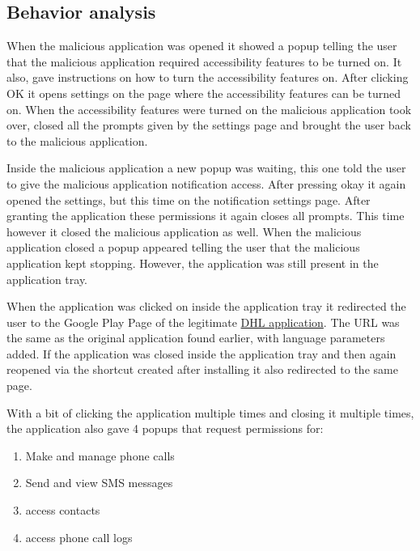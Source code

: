 \subsection{Behavior analysis}

When the malicious application was opened it showed a popup telling the user that the malicious application required accessibility features to be turned on.
It also, gave instructions on how to turn the accessibility features on.
After clicking OK it opens settings on the page where the accessibility features can be turned on. 
When the accessibility features were turned on the malicious application took over, closed all the prompts given by the settings page and brought the user back to the malicious application.

Inside the malicious application a new popup was waiting, this one told the user to give the malicious application notification access. After pressing okay it again opened the settings, but this time on the notification settings page. After granting the application these permissions it again closes all prompts. 
This time however it closed the malicious application as well.
When the malicious application closed a popup appeared telling the user that the malicious application kept stopping.
However, the application was still present in the application tray.

When the application was clicked on inside the application tray it redirected the user to the Google Play Page of the legitimate \href{https://play.google.com/store/apps/details?id=com.dhl.exp.dhlmobile&hl=en&gl=US}{DHL application}.
The URL was the same as the original application found earlier, with language parameters added.
If the application was closed inside the application tray and then again reopened via the shortcut created after installing it also redirected to the same page.

With a bit of clicking the application multiple times and closing it multiple times, the application also gave 4 popups that request permissions for:
\begin{enumerate}
    \item Make and manage phone calls
    \item Send and view SMS messages
    \item access contacts
    \item access phone call logs
\end{enumerate}

